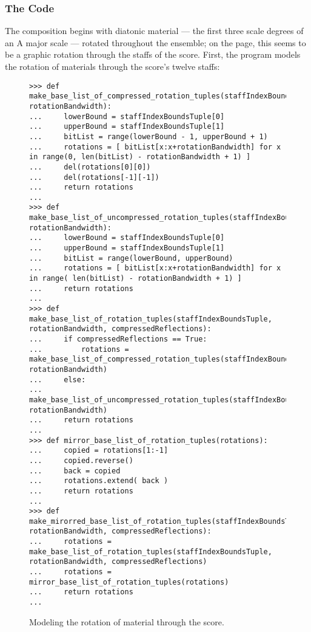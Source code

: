 \subsubsection{The Code}

The composition begins with diatonic material --- the first three scale degrees of an A major scale --- rotated throughout the ensemble; on the page, this seems to be a graphic rotation through the staffs of the score. First, the program models the rotation of materials through the score's twelve staffs:
\begin{figure}[H] 
\begin{lstlisting}[basicstyle=\scriptsize\ttfamily, breaklines=True, tabsize=4, showtabs=false, showspaces=false]
>>> def make_base_list_of_compressed_rotation_tuples(staffIndexBoundsTuple, rotationBandwidth):
...     lowerBound = staffIndexBoundsTuple[0]
...     upperBound = staffIndexBoundsTuple[1]
...     bitList = range(lowerBound - 1, upperBound + 1)
...     rotations = [ bitList[x:x+rotationBandwidth] for x in range(0, len(bitList) - rotationBandwidth + 1) ]
...     del(rotations[0][0])
...     del(rotations[-1][-1])
...     return rotations
... 
>>> def make_base_list_of_uncompressed_rotation_tuples(staffIndexBoundsTuple, rotationBandwidth):
...     lowerBound = staffIndexBoundsTuple[0]
...     upperBound = staffIndexBoundsTuple[1]
...     bitList = range(lowerBound, upperBound)
...     rotations = [ bitList[x:x+rotationBandwidth] for x in range( len(bitList) - rotationBandwidth + 1) ]
...     return rotations
... 
>>> def make_base_list_of_rotation_tuples(staffIndexBoundsTuple, rotationBandwidth, compressedReflections):
...     if compressedReflections == True:
...         rotations = make_base_list_of_compressed_rotation_tuples(staffIndexBoundsTuple, rotationBandwidth)
...     else:
...         make_base_list_of_uncompressed_rotation_tuples(staffIndexBoundsTuple, rotationBandwidth)
...     return rotations
... 
>>> def mirror_base_list_of_rotation_tuples(rotations):
...     copied = rotations[1:-1]
...     copied.reverse()
...     back = copied
...     rotations.extend( back )
...     return rotations
... 
>>> def make_mirorred_base_list_of_rotation_tuples(staffIndexBoundsTuple, rotationBandwidth, compressedReflections):
...     rotations = make_base_list_of_rotation_tuples(staffIndexBoundsTuple, rotationBandwidth, compressedReflections)
...     rotations = mirror_base_list_of_rotation_tuples(rotations)
...     return rotations
... \end{lstlisting}

\caption{Modeling the rotation of material through the score. } 
\end{figure}

